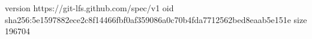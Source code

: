 version https://git-lfs.github.com/spec/v1
oid sha256:5e1597882ece2c8f14466fbf0af359086a0c70b4fda7712562bed8eaab5e151e
size 196704
